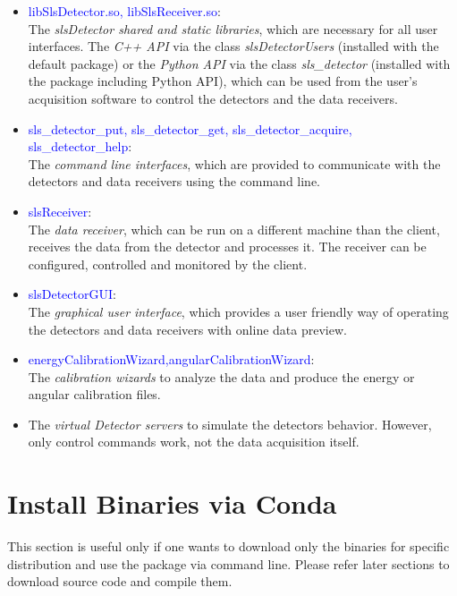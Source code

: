 \documentclass{article}
\begin{document}
\begin{itemize}

\item \textcolor{blue}{libSlsDetector.so, libSlsReceiver.so}:\\
The \textit{slsDetector shared and static libraries}, which are
necessary for all user interfaces. The \textit{C++ API} via the class
\textit{slsDetectorUsers} (installed with the default package) or the
\textit{Python API} via the class \textit{sls\_detector} (installed with the
package including Python API), which can be used from the user's acquisition
software to control the detectors and the data receivers.

\item \textcolor{blue}{sls\_detector\_put, sls\_detector\_get,
sls\_detector\_acquire, sls\_detector\_help}: \\
The \textit{command line interfaces}, which are provided to communicate with the
detectors and data receivers using the command line.

\item \textcolor{blue}{slsReceiver}: \\
The \textit{data receiver}, which can be run on a different machine than the
client, receives the data from the detector and processes it. The receiver can
be configured, controlled and monitored by the client.

\item \textcolor{blue}{slsDetectorGUI}: \\
The \textit{graphical user interface}, which provides a user friendly way
of operating the detectors and data receivers with online data preview.

\item \textcolor{blue}{energyCalibrationWizard,angularCalibrationWizard}: \\
The \textit{calibration wizards} to analyze the data and produce the energy or
angular calibration files.

\item The \textit{virtual Detector servers} to simulate the detectors behavior.
However, only control commands work, not the data acquisition itself.
\end{itemize}




\section{Install Binaries via Conda}
This section is useful only if one wants to download only the binaries for
specific distribution and use the package via command line. Please refer later
sections to download source code and compile them.
\end{document}
